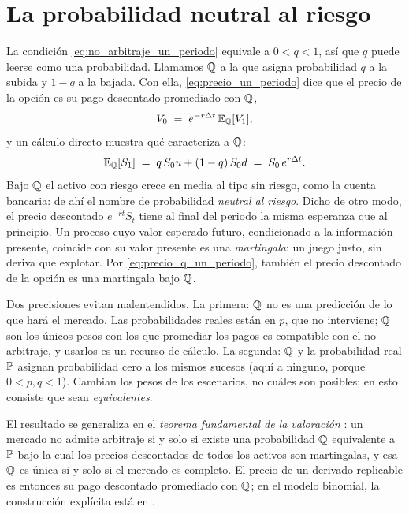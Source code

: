 \section{La probabilidad neutral al riesgo}\label{sec:neutral_riesgo}

La condición \eqref{eq:no_arbitraje_un_periodo} equivale a $0 < q < 1$,
así que $q$ puede leerse como una probabilidad. Llamamos $\mathbb{Q}$ a la que
asigna probabilidad $q$ a la subida y $1 - q$ a la bajada. Con ella,
\eqref{eq:precio_un_periodo} dice que el precio de la opción es su pago
descontado promediado con $\mathbb{Q}$,
\begin{equation}\label{eq:precio_q_un_periodo}
  V_0 \;=\; e^{-r\Delta t}\, \mathbb{E}_{\mathbb{Q}}[V_1],
\end{equation}
y un cálculo directo muestra qué caracteriza a $\mathbb{Q}$:
\begin{equation}\label{eq:q_crecimiento_r}
  \mathbb{E}_{\mathbb{Q}}[S_1] \;=\; q\, S_0 u + (1 - q)\, S_0 d \;=\; S_0\, e^{r\Delta t}.
\end{equation}
Bajo $\mathbb{Q}$ el activo con riesgo crece en media al tipo sin riesgo, como
la cuenta bancaria: de ahí el nombre de probabilidad \emph{neutral al
riesgo}. Dicho de otro modo, el precio descontado $e^{-rt}S_t$ tiene al
final del periodo la misma esperanza que al principio. Un proceso cuyo
valor esperado futuro, condicionado a la información presente, coincide
con su valor presente es una \emph{martingala}: un juego justo, sin
deriva que explotar. Por \eqref{eq:precio_q_un_periodo}, también el
precio descontado de la opción es una martingala bajo $\mathbb{Q}$.

Dos precisiones evitan malentendidos. La primera: $\mathbb{Q}$ no es una
predicción de lo que hará el mercado. Las probabilidades reales están
en $p$, que no interviene; $\mathbb{Q}$ son los únicos pesos con los que
promediar los pagos es compatible con el no arbitraje, y usarlos es un
recurso de cálculo. La segunda: $\mathbb{Q}$ y la probabilidad real $\mathbb{P}$
asignan probabilidad cero a los mismos sucesos (aquí a ninguno, porque
$0 < p, q < 1$). Cambian los pesos de los escenarios, no cuáles son
posibles; en esto consiste que sean \emph{equivalentes}.

El resultado se generaliza en el \emph{teorema fundamental de la
valoración} \cite[sec.~5.4]{shreve}: un mercado no admite arbitraje si
y solo si existe una probabilidad $\mathbb{Q}$ equivalente a $\mathbb{P}$ bajo la cual
los precios descontados de todos los activos son martingalas, y esa
$\mathbb{Q}$ es única si y solo si el mercado es completo. El precio de un
derivado replicable es entonces su pago descontado promediado con $\mathbb{Q}$;
en el modelo binomial, la construcción explícita está en
\cite[secs.~2.2--2.3]{tfgm}.

